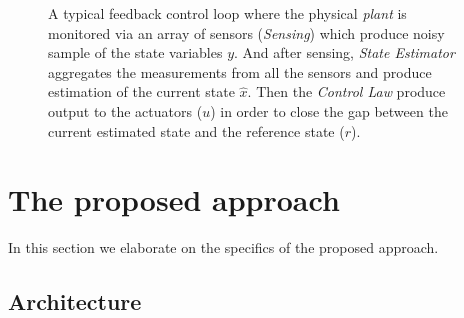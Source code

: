 \documentclass[ twoside, 12pt ]{article}
\begin{document}
\begin{figure}[]
    \centering
    
    
    \caption{A typical feedback control loop where the physical \textit{plant} is monitored via an array of sensors (\textit{Sensing}) which produce noisy sample of the state variables $y$. 
    And after sensing, \textit{State Estimator} aggregates the measurements from all the sensors and produce estimation of the current state $\hat{x}$. Then the \textit{Control Law} produce output to the actuators ($u$) in order to close the gap between the current estimated state and the reference state ($r$).
    \label{fig:control loop}}
\end{figure}

\section{The proposed approach} %
\label{sec:architecture}
In this section we elaborate on the specifics of the proposed approach.


\subsection{Architecture}
\end{document}
